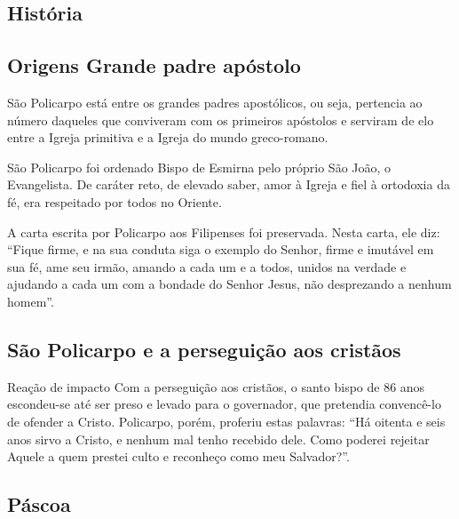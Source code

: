 \documentclass[18pt]{article}
\begin{document}
\begin{justify}

 \begin{center}
  \section{História}\label{sec:História} %
 \end{center}


 \begin{justify}
  \subsection{Origens Grande padre apóstolo}
 \end{justify}

São Policarpo está entre os grandes padres apostólicos, ou seja, pertencia ao número daqueles que conviveram com os primeiros apóstolos e serviram de elo entre a Igreja primitiva e a Igreja do mundo greco-romano.

São Policarpo foi ordenado Bispo de Esmirna pelo próprio São João, o Evangelista. De caráter reto, de elevado saber, amor à Igreja e fiel à ortodoxia da fé, era respeitado por todos no Oriente.

A carta escrita por Policarpo aos Filipenses foi preservada. Nesta carta, ele diz: “Fique firme, e na sua conduta siga o exemplo do Senhor, firme e imutável em sua fé, ame seu irmão, amando a cada um e a todos, unidos na verdade e ajudando a cada um com a bondade do Senhor Jesus, não desprezando a nenhum homem”.

\begin{justify}
 \subsection{São Policarpo e a perseguição aos cristãos}
\end{justify}

Reação de impacto
Com a perseguição aos cristãos, o santo bispo de 86 anos escondeu-se até ser preso e levado para o governador, que pretendia convencê-lo de ofender a Cristo. Policarpo, porém, proferiu estas palavras: “Há oitenta e seis anos sirvo a Cristo, e nenhum mal tenho recebido dele. Como poderei rejeitar Aquele a quem prestei culto e reconheço como meu Salvador?”.


\vspace{.8cm}
\begin{justify}
 \subsection{Páscoa}
\end{justify}


\end{justify}
\end{document}
